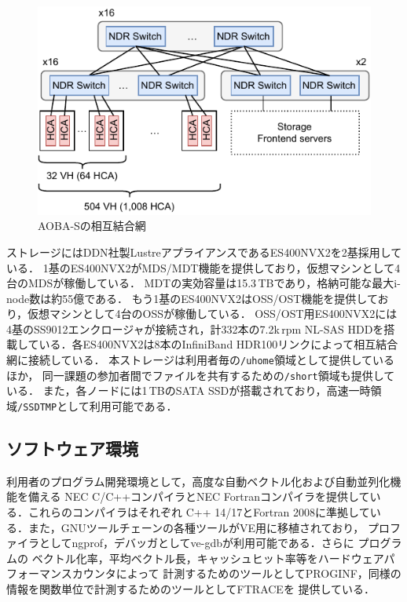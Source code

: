 ﻿\documentclass[submit,techrep,noauthor]{ipsj}
\begin{document}
\begin{figure}[tb]
  \centering
  \includegraphics[scale=0.9]{figs/nw_topology.pdf}
  \caption{AOBA-Sの相互結合網}\label{fig:topo}
\end{figure}

ストレージにはDDN社製LustreアプライアンスであるES400NVX2を2基採用している．
1基のES400NVX2がMDS/MDT機能を提供しており，仮想マシンとして4台のMDSが稼働している．
MDTの実効容量は15.3\,TBであり，格納可能な最大i-node数は約55億である．
もう1基のES400NVX2はOSS/OST機能を提供しており，仮想マシンとして4台のOSSが稼働している．
OSS/OST用ES400NVX2には4基のSS9012エンクロージャが接続され，計332本の7.2k\,rpm NL-SAS
HDDを搭載している．各ES400NVX2は8本のInfiniBand HDR100リンクによって相互結合網に接続している．
本ストレージは利用者毎の\verb|/uhome|領域として提供しているほか，
同一課題の参加者間でファイルを共有するための\verb|/short|領域も提供している．
また，各ノードには1\,TBのSATA SSDが搭載されており，高速一時領域\verb|/SSDTMP|として利用可能である．

\subsection{ソフトウェア環境}

利用者のプログラム開発環境として，高度な自動ベクトル化および自動並列化機能を備える
NEC C/C++コンパイラとNEC Fortranコンパイラを提供している．これらのコンパイラはそれぞれ
C++ 14/17とFortran 2008に準拠している．また，GNUツールチェーンの各種ツールがVE用に移植されており，
プロファイラとしてngprof，デバッガとしてve-gdbが利用可能である．さらに
プログラムの
ベクトル化率，平均ベクトル長，キャッシュヒット率等をハードウェアパフォーマンスカウンタによって
計測するためのツールとしてPROGINF，同様の情報を関数単位で計測するためのツールとしてFTRACEを
提供している．
\end{document}
